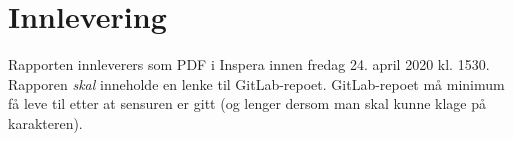 \documentclass[11pt,a4paper]{article}
\begin{document}
\section{Innlevering}

Rapporten innleverers som PDF i Inspera innen fredag 24. april 2020 kl. 1530. Rapporen \emph{skal} inneholde en lenke til GitLab-repoet. GitLab-repoet må minimum få leve til etter at sensuren er gitt (og lenger dersom man skal kunne klage på karakteren).



\end{document}
